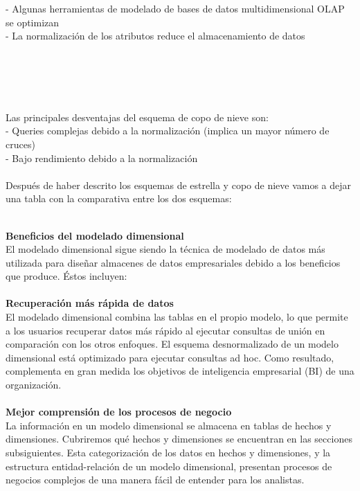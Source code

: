 \documentclass[twoside,twocolumn]{article}
\begin{document}
\begin{enumerate}
- Algunas herramientas de modelado de bases de datos multidimensional OLAP se optimizan\textbf{}\\
- La normalización de los atributos reduce el almacenamiento de datos\textbf{}\\
\textbf{}\\
\textbf{}\\

\textbf{}\\
\textbf{}\\
\textbf{}\\
Las principales desventajas del esquema de copo de nieve son:\textbf{}\\
- Queries complejas debido a la normalización (implica un mayor número de cruces)\textbf{}\\
- Bajo rendimiento debido a la normalización\textbf{}\\
\textbf{}\\
Después de haber descrito los esquemas de estrella y copo de nieve vamos a dejar una tabla con la comparativa entre los dos esquemas:

\textbf{}\\
\textbf{Beneficios del modelado dimensional}
\textbf{}\\
El modelado dimensional sigue siendo la técnica de modelado de datos más utilizada para diseñar almacenes de datos empresariales debido a los beneficios que produce. Éstos incluyen:
\textbf{}\\
\textbf{}\\
\textbf{Recuperación más rápida de datos}\\
El modelado dimensional combina las tablas en el propio modelo, lo que permite a los usuarios recuperar datos más rápido al ejecutar consultas de unión en comparación con los otros enfoques. El esquema desnormalizado de un modelo dimensional está optimizado para ejecutar consultas ad hoc. Como resultado, complementa en gran medida los objetivos de inteligencia empresarial (BI) de una organización.
\textbf{}\\
\textbf{}\\
\textbf{Mejor comprensión de los procesos de negocio}\\
La información en un modelo dimensional se almacena en tablas de hechos y dimensiones. Cubriremos qué hechos y dimensiones se encuentran en las secciones subsiguientes. Esta categorización de los datos en hechos y dimensiones, y la estructura entidad-relación de un modelo dimensional, presentan procesos de negocios complejos de una manera fácil de entender para los analistas.\textbf{}\\
\textbf{}\\
\textbf{}\\


\end{enumerate}
\end{document}

